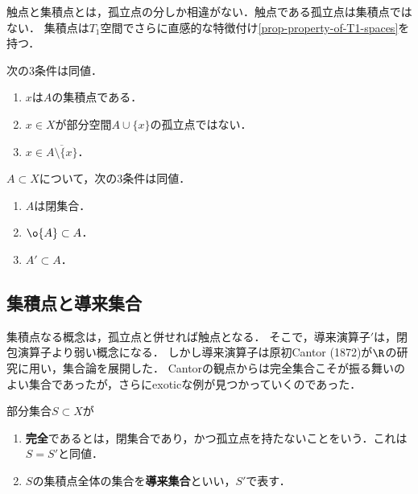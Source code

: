 \documentclass[uplatex,dvipdfmx]{jsreport}
\begin{document}
\begin{tcolorbox}[colframe=ForestGreen, colback=ForestGreen!10!white,breakable,colbacktitle=ForestGreen!40!white,coltitle=black,fonttitle=\bfseries\sffamily,
title=]
    触点と集積点とは，孤立点の分しか相違がない．触点である孤立点は集積点ではない．
    集積点は$T_1$空間でさらに直感的な特徴付け\ref{prop-property-of-T1-spaces}を持つ．
\end{tcolorbox}

\begin{proposition}[集積点の特徴付け]
    次の3条件は同値．
    \begin{enumerate}
        \item $x$は$A$の集積点である．
        \item $x\in X$が部分空間$A\cup\{x\}$の孤立点ではない．
        \item $x\in\overline{A\setminus\{x\}}$．
    \end{enumerate}
\end{proposition}

\begin{proposition}
    $A\subset X$について，次の3条件は同値．
    \begin{enumerate}
        \item $A$は閉集合．
        \item $\o{A}\subset A$．
        \item $A'\subset A$．
    \end{enumerate}
\end{proposition}

\subsection{集積点と導来集合}

\begin{tcolorbox}[colframe=ForestGreen, colback=ForestGreen!10!white,breakable,colbacktitle=ForestGreen!40!white,coltitle=black,fonttitle=\bfseries\sffamily,
title=]
    集積点なる概念は，孤立点と併せれば触点となる．
    そこで，導来演算子$'$は，閉包演算子より弱い概念になる．
    しかし導来演算子は原初Cantor (1872)が$\R$の研究に用い，集合論を展開した．
    Cantorの観点からは完全集合こそが振る舞いのよい集合であったが，さらにexoticな例が見つかっていくのであった．
\end{tcolorbox}

\begin{definition}
    部分集合$S\subset X$が
    \begin{enumerate}
        \item \textbf{完全}であるとは，閉集合であり，かつ孤立点を持たないことをいう．これは$S=S'$と同値．
        \item $S$の集積点全体の集合を\textbf{導来集合}といい，$S'$で表す．
    \end{enumerate}
\end{definition}
\end{document}
